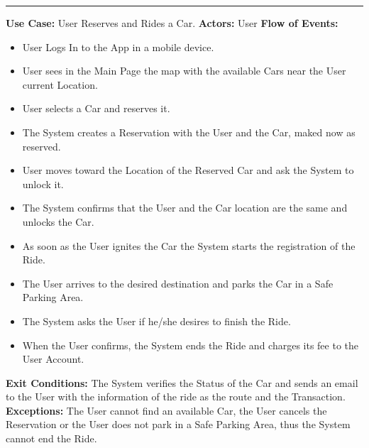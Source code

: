 \documentclass[a4paper]{article}
\begin{document}
\begin{center}
\rule{8cm}{0.4pt}
\end{center}
\textbf{Use Case:} User Reserves and Rides a Car.
\newline
\textbf{Actors:} User
\newline
\textbf{Flow of Events:}
\begin{itemize}
\item User Logs In to the App in a mobile device.
\item User sees in the Main Page the map with the available Cars near the User current Location.
\item User selects a Car and reserves it.
\item The System creates a Reservation with the User and the Car, maked now as reserved.
\item User moves toward the Location of the Reserved Car and ask the System to unlock it.
\item The System confirms that the User and the Car location are the same and unlocks the Car.
\item As soon as the User ignites the Car the System starts the registration of the Ride.
\item The User arrives to the desired destination and parks the Car in a Safe Parking Area.
\item The System asks the User if he/she desires to finish the Ride.
\item When the User confirms, the System ends the Ride and charges its fee to the User Account. 
\end{itemize}
\textbf{Exit Conditions:} The System verifies the Status of the Car and sends an email to the User with the information of the ride as the route and the Transaction.
\newline 
\textbf{Exceptions:} The User cannot find an available Car, the User cancels the Reservation or the User does not park in a Safe Parking Area, thus the System cannot end the Ride.
\newline
\end{document}
